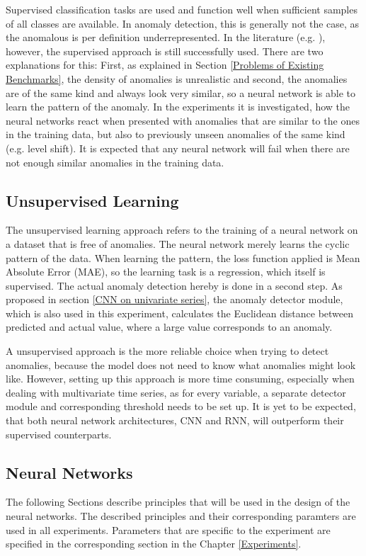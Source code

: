 Supervised classification tasks are used and function well when sufficient samples of all classes are available. In anomaly detection, this is generally not the case, as the anomalous is per definition underrepresented. In the literature (e.g. \parencite{Wen2019}), however, the supervised approach is still successfully used. There are two explanations for this: First, as explained in Section \ref{Problems of Existing Benchmarks}, the density of anomalies is unrealistic and second, the anomalies are of the same kind and always look very similar, so a neural network is able to learn the pattern of the anomaly. In the experiments it is investigated, how the neural networks react when presented with anomalies that are similar to the ones in the training data, but also to previously unseen anomalies of the same kind (e.g. level shift). It is expected that any neural network will fail when there are not enough similar anomalies in the training data.

\subsection{Unsupervised Learning}
The unsupervised learning approach refers to the training of a neural network on a dataset that is free of anomalies. The neural network merely learns the cyclic pattern of the data. When learning the pattern, the loss function applied is Mean Absolute Error (MAE), so the learning task is a regression, which itself is supervised. The actual anomaly detection hereby is done in a second step. As proposed in section \ref{CNN on univariate series}, the anomaly detector module, which is also used in this experiment, calculates the Euclidean distance between predicted and actual value, where a large value corresponds to an anomaly.

A unsupervised approach is the more reliable choice when trying to detect anomalies, because the model does not need to know what anomalies might look like. However, setting up this approach is more time consuming, especially when dealing with multivariate time series, as for every variable, a separate detector module and corresponding threshold needs to be set up. It is yet to be expected, that both neural network architectures, CNN and RNN, will outperform their supervised counterparts. 

\subsection{Neural Networks}
The following Sections describe principles that will be used in the design of the neural networks. The described principles and their corresponding paramters are used in all experiments. Parameters that are specific to the experiment are specified in the corresponding section in the Chapter \ref{Experiments}. 

